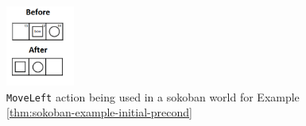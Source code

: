 \documentclass[../Master.tex]{subfiles}
\begin{document}
\begin{figure}
	\centering
	\includegraphics[width=0.2\textwidth]{../Graphics/soko_cond_example.png}
	
	\caption{\label{fig:soko-conditional}\texttt{MoveLeft} action being used in a sokoban world for Example \ref{thm:sokoban-example-initial-precond} }	
	
\end{figure}

\newtheorem{thm-sokoban-example-initial-precond}{Example}[section]
\end{document}
